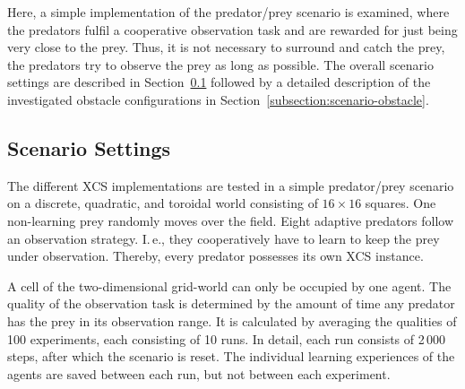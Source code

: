 Here, a simple implementation of the predator/prey scenario is examined, where the predators fulfil a cooperative observation task and are rewarded for just being very close to the prey. Thus, it is not necessary to surround and catch the prey, the predators try to observe the prey as long as possible. The overall scenario settings are described in Section~\ref{subsection:scenario-settings} followed by a detailed description of the investigated obstacle configurations in Section~\ref{subsection:scenario-obstacle}. %

\subsection{Scenario Settings}
\label{subsection:scenario-settings}

The different XCS implementations are tested in a simple predator/prey scenario on a discrete, quadratic, and toroidal world consisting of $16 \times 16$ squares. One non-learning prey randomly moves over the field. %
Eight adaptive predators follow an observation strategy. I.\,e., they cooperatively have to learn to keep the prey under observation. Thereby, every predator possesses its own XCS instance. 

A cell of the two-dimensional grid-world can only be occupied by one agent. The quality of the observation task is determined by the amount of time any predator has the prey in its observation range. It is calculated by averaging the qualities of 100 experiments, each consisting of 10 runs. In detail, each run consists of 2\,000 steps, after which the scenario is reset. The individual learning experiences of the agents are saved between each run, but not between each experiment.

